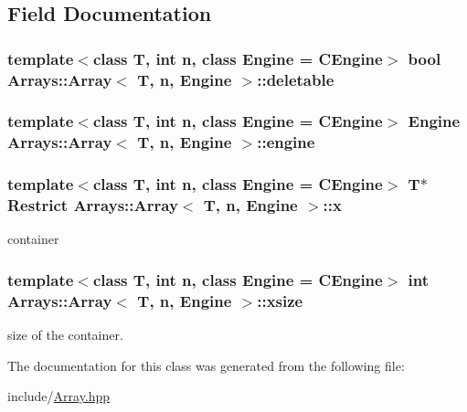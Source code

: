 \subsection{Field Documentation}
\hypertarget{classArrays_1_1Array_a3594f356a6b8587ebe62c0066fd6bd0c}{}
\subsubsection[{deletable}]{\setlength{\rightskip}{0pt plus 5cm}template$<$class T, int n, class Engine = C\+Engine$>$ bool {\bf Arrays\+::\+Array}$<$ T, n, Engine $>$\+::deletable\hspace{0.3cm}{\ttfamily [private]}}\label{classArrays_1_1Array_a3594f356a6b8587ebe62c0066fd6bd0c}
\hypertarget{classArrays_1_1Array_a05278d5848221895775d5601800260aa}{}
\subsubsection[{engine}]{\setlength{\rightskip}{0pt plus 5cm}template$<$class T, int n, class Engine = C\+Engine$>$ Engine {\bf Arrays\+::\+Array}$<$ T, n, Engine $>$\+::engine\hspace{0.3cm}{\ttfamily [private]}}\label{classArrays_1_1Array_a05278d5848221895775d5601800260aa}
\hypertarget{classArrays_1_1Array_aaf9eb3add119c03266706ad9e5efa539}{}
\subsubsection[{x}]{\setlength{\rightskip}{0pt plus 5cm}template$<$class T, int n, class Engine = C\+Engine$>$ T$\ast$ Restrict {\bf Arrays\+::\+Array}$<$ T, n, Engine $>$\+::x\hspace{0.3cm}{\ttfamily [private]}}\label{classArrays_1_1Array_aaf9eb3add119c03266706ad9e5efa539}


container 

\hypertarget{classArrays_1_1Array_a5f845efc1be7986ebd3f8a7e57549b91}{}
\subsubsection[{xsize}]{\setlength{\rightskip}{0pt plus 5cm}template$<$class T, int n, class Engine = C\+Engine$>$ int {\bf Arrays\+::\+Array}$<$ T, n, Engine $>$\+::xsize\hspace{0.3cm}{\ttfamily [private]}}\label{classArrays_1_1Array_a5f845efc1be7986ebd3f8a7e57549b91}


size of the container. 



The documentation for this class was generated from the following file\+:\begin{DoxyCompactItemize}
\item 
include/\hyperlink{Array_8hpp}{Array.\+hpp}\end{DoxyCompactItemize}
